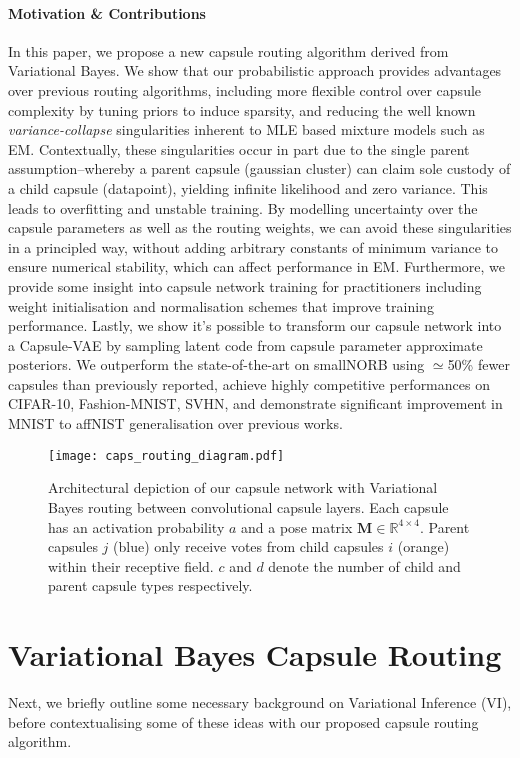 \documentclass[letterpaper]{article} \usepackage{aaai20}  \usepackage{times}  \usepackage{helvet} \usepackage{courier}  \usepackage[hyphens]{url}  \usepackage{graphicx} \urlstyle{rm} \def\UrlFont{\rm}  \usepackage{graphicx}  \frenchspacing  \setlength{\pdfpagewidth}{8.5in}  \setlength{\pdfpageheight}{11in}  \nocopyright
\begin{document}
\paragraph{Motivation \& Contributions}
In this paper, we propose a new capsule routing algorithm derived from Variational Bayes. We show that our probabilistic approach provides advantages over previous routing algorithms, including more flexible control over capsule complexity by tuning priors to induce sparsity, and reducing the well known \textit{variance-collapse} singularities inherent to MLE based mixture models such as EM. Contextually, these singularities occur in part due to the single parent assumption--whereby a parent capsule (gaussian cluster) can claim sole custody of a child capsule (datapoint), yielding infinite likelihood and zero variance. This leads to overfitting and unstable training. By modelling uncertainty over the capsule parameters as well as the routing weights, we can avoid these singularities in a principled way, without adding arbitrary constants of minimum variance to ensure numerical stability, which can affect performance in EM. Furthermore, we provide some insight into capsule network training for practitioners including weight initialisation and normalisation schemes that improve training performance. Lastly, we show it's possible to transform our capsule network into a Capsule-VAE by sampling latent code from capsule parameter approximate posteriors. We outperform the state-of-the-art on smallNORB using $\simeq$50\% fewer capsules than previously reported, achieve highly competitive performances on CIFAR-10, Fashion-MNIST, SVHN, and demonstrate significant improvement in MNIST to affNIST generalisation over previous works.
\begin{figure*}[t]
    \centering
    \texttt{[image: caps\_routing\_diagram.pdf]}
 \caption{Architectural depiction of our capsule network with Variational Bayes routing between convolutional capsule layers. Each capsule has an activation probability $a$ and a pose matrix $\mathbf{M}\in\mathbb{R}^{4\times4}$. Parent capsules $j$ (blue) only receive votes from child capsules $i$ (orange) within their receptive field. $c$ and $d$ denote the number of child and parent capsule types respectively.}
\label{big_diagram}
\end{figure*}  
\section{Variational Bayes Capsule Routing}\label{sec: Variational Bayes Routing}
Next, we briefly outline some necessary background on Variational Inference (VI), before contextualising some of these ideas with our proposed capsule routing algorithm.
\end{document}
